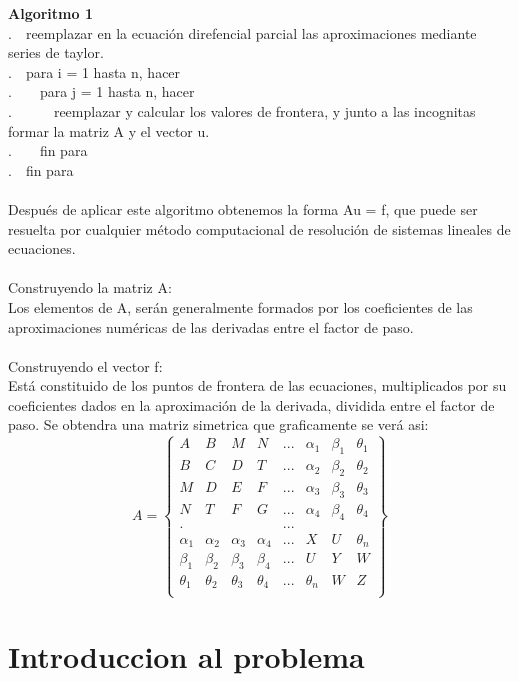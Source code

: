 \documentclass[11pt,a4paper]{article}
\begin{document}
\textbf{Algoritmo 1}\\
.~~reemplazar en la ecuación direfencial parcial las aproximaciones mediante series de taylor.\\
.~~para i = 1 hasta n, hacer\\
.~~~~para j = 1 hasta n, hacer\\
.~~~~~~reemplazar y calcular los valores de frontera, y junto a las incognitas formar la matriz A y el vector u.\\
.~~~~fin para\\
.~~fin para\\
\\
Después de aplicar este algoritmo obtenemos la forma Au = f, que puede ser resuelta por cualquier método computacional de resolución de sistemas lineales de ecuaciones.\\\\
Construyendo la matriz A:\\
Los elementos de A, serán generalmente formados por los coeficientes de las aproximaciones numéricas de las derivadas entre el factor de paso.\\
\\
Construyendo el vector f:\\
Está constituido de los puntos de frontera de las ecuaciones, multiplicados por su coeficientes dados en la aproximación de la derivada, dividida entre el factor de paso.
Se obtendra una matriz simetrica que graficamente se verá asi:
$$
A=\left\{\begin{array}{cccccccc}
    A & B & M & N & ... & \alpha_1 & \beta_1 & \theta_1\\
    B & C & D & T & ... & \alpha_2 & \beta_2 & \theta_2\\
    M & D & E & F & ... & \alpha_3 & \beta_3 & \theta_3\\
    N & T & F & G & ... & \alpha_4 & \beta_4 & \theta_4\\
    . &   &   &   & ... &   &   &  \\
    \alpha_1 & \alpha_2 & \alpha_3 & \alpha_4 & ... & X & U & \theta_n\\
    \beta_1 & \beta_2 & \beta_3 & \beta_4 & ... & U & Y & W\\
    \theta_1 & \theta_2 & \theta_3 & \theta_4 & ... & \theta_n & W & Z\\
    \end{array}\right\}
$$

\section{Introduccion al problema}
\end{document}
